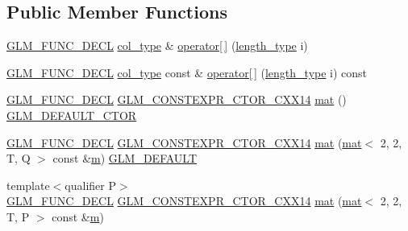\subsection*{Public Member Functions}
\begin{DoxyCompactItemize}
\item 
\hyperlink{setup_8hpp_ab2d052de21a70539923e9bcbf6e83a51}{G\+L\+M\+\_\+\+F\+U\+N\+C\+\_\+\+D\+E\+CL} \hyperlink{structglm_1_1mat_3_012_00_012_00_01_t_00_01_q_01_4_a2983591534ee443dd378cedcbe771749}{col\+\_\+type} \& \hyperlink{structglm_1_1mat_3_012_00_012_00_01_t_00_01_q_01_4_a3412817642a709f843240b51f05514a5}{operator\mbox{[}$\,$\mbox{]}} (\hyperlink{structglm_1_1mat_3_012_00_012_00_01_t_00_01_q_01_4_a96c65b091fc8fe8e6f5637e30c9c1f81}{length\+\_\+type} i)
\item 
\hyperlink{setup_8hpp_ab2d052de21a70539923e9bcbf6e83a51}{G\+L\+M\+\_\+\+F\+U\+N\+C\+\_\+\+D\+E\+CL} \hyperlink{structglm_1_1mat_3_012_00_012_00_01_t_00_01_q_01_4_a2983591534ee443dd378cedcbe771749}{col\+\_\+type} const  \& \hyperlink{structglm_1_1mat_3_012_00_012_00_01_t_00_01_q_01_4_a06ff5b61af6353d73db79acd46534b0c}{operator\mbox{[}$\,$\mbox{]}} (\hyperlink{structglm_1_1mat_3_012_00_012_00_01_t_00_01_q_01_4_a96c65b091fc8fe8e6f5637e30c9c1f81}{length\+\_\+type} i) const
\item 
\hyperlink{setup_8hpp_ab2d052de21a70539923e9bcbf6e83a51}{G\+L\+M\+\_\+\+F\+U\+N\+C\+\_\+\+D\+E\+CL} \hyperlink{setup_8hpp_a0900f9145e68bf6061b6f5e7be3fa751}{G\+L\+M\+\_\+\+C\+O\+N\+S\+T\+E\+X\+P\+R\+\_\+\+C\+T\+O\+R\+\_\+\+C\+X\+X14} \hyperlink{structglm_1_1mat_3_012_00_012_00_01_t_00_01_q_01_4_a8601499ee4cd49be39e8497bbef84d91}{mat} () \hyperlink{setup_8hpp_afb97a4e995bc004c0cbbfa22125b80ba}{G\+L\+M\+\_\+\+D\+E\+F\+A\+U\+L\+T\+\_\+\+C\+T\+OR}
\item 
\hyperlink{setup_8hpp_ab2d052de21a70539923e9bcbf6e83a51}{G\+L\+M\+\_\+\+F\+U\+N\+C\+\_\+\+D\+E\+CL} \hyperlink{setup_8hpp_a0900f9145e68bf6061b6f5e7be3fa751}{G\+L\+M\+\_\+\+C\+O\+N\+S\+T\+E\+X\+P\+R\+\_\+\+C\+T\+O\+R\+\_\+\+C\+X\+X14} \hyperlink{structglm_1_1mat_3_012_00_012_00_01_t_00_01_q_01_4_aa45ca90831c32104d9c29f84ec0b9dac}{mat} (\hyperlink{structglm_1_1mat}{mat}$<$ 2, 2, T, Q $>$ const \&\hyperlink{_s_d_l__opengl__glext_8h_af593500c283bf1a787a6f947f503a5c2}{m}) \hyperlink{setup_8hpp_aefce7051c376a64ba89fa93a9f63bc2c}{G\+L\+M\+\_\+\+D\+E\+F\+A\+U\+LT}
\item 
{\footnotesize template$<$qualifier P$>$ }\\\hyperlink{setup_8hpp_ab2d052de21a70539923e9bcbf6e83a51}{G\+L\+M\+\_\+\+F\+U\+N\+C\+\_\+\+D\+E\+CL} \hyperlink{setup_8hpp_a0900f9145e68bf6061b6f5e7be3fa751}{G\+L\+M\+\_\+\+C\+O\+N\+S\+T\+E\+X\+P\+R\+\_\+\+C\+T\+O\+R\+\_\+\+C\+X\+X14} \hyperlink{structglm_1_1mat_3_012_00_012_00_01_t_00_01_q_01_4_a0e9852f49f319a99409e663be26c089e}{mat} (\hyperlink{structglm_1_1mat}{mat}$<$ 2, 2, T, P $>$ const \&\hyperlink{_s_d_l__opengl__glext_8h_af593500c283bf1a787a6f947f503a5c2}{m})

\end{DoxyCompactItemize}
